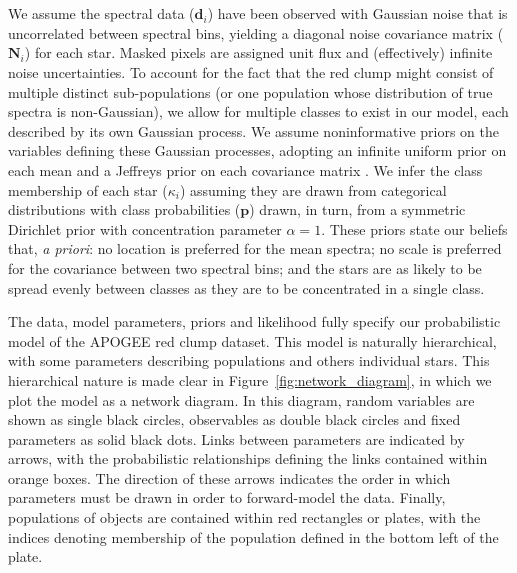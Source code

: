 \documentclass[a4paper,fleqn,usenatbib]{mnras}
\newcommand{\classprobs}{{\bm p}}
\newcommand{\objclass}{{\kappa}}
\newcommand{\objdata}{\hat{\bm d}}
\newcommand{\objnoise}{{\bm N}}
\begin{document}
We assume the spectral data ($\objdata_i$) have been observed with Gaussian noise that is uncorrelated between spectral bins, yielding a diagonal noise covariance matrix ($\objnoise_i$) for each star. Masked pixels are assigned unit flux and (effectively) infinite noise uncertainties. To account for the fact that the red clump might consist of multiple distinct sub-populations (or one population whose distribution of true spectra is non-Gaussian), we allow for multiple classes to exist in our model, each described by its own Gaussian process. We assume noninformative priors on the variables defining these Gaussian processes, adopting an infinite uniform prior on each mean and a Jeffreys prior on each covariance matrix \citep[p73]{Gelman_etal:2013}. We infer the class membership of each star ($\objclass_i$) assuming they are drawn from categorical distributions with class probabilities ($\classprobs$) drawn, in turn, from a symmetric Dirichlet prior with concentration parameter $\alpha=1$. These priors state our beliefs that, {\it a priori}: no location is preferred for the mean spectra; no scale is preferred for the covariance between two spectral bins; and the stars are as likely to be spread evenly between classes as they are to be concentrated in a single class.

The data, model parameters, priors and likelihood fully specify our probabilistic model of the APOGEE red clump dataset. This model is naturally hierarchical, with some parameters describing populations and others individual stars. This hierarchical nature is made clear in Figure~\ref{fig:network_diagram}, in which we plot the model as a network diagram. In this diagram, random variables are shown as single black circles, observables as double black circles and fixed parameters as solid black dots. Links between parameters are indicated by arrows, with the probabilistic relationships defining the links contained within orange boxes. The direction of these arrows indicates the order in which parameters must be drawn in order to forward-model the data. Finally, populations of objects are contained within red rectangles or plates, with the indices denoting membership of the population defined in the bottom left of the plate.
\end{document}
